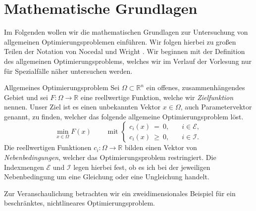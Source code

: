 \section{Mathematische Grundlagen}
\label{s:opt_grundlagen}
Im Folgenden wollen wir die mathematischen Grundlagen zur Untersuchung von allgemeinen Optimierungsproblemen einführen. 
Wir folgen hierbei zu großen Teilen der Notation von Nocedal und Wright \cite{nocedal_1999}. 
Wir beginnen mit der Definition des allgemeinen Optimierungsproblems, welches wir im Verlauf der Vorlesung nur für Spezialfälle näher untersuchen werden.
\begin{definition}{Allgemeines Optimierungsproblem}{}
Sei $\Omega \subset \mathbb{R}^n$ ein offenes, zusammenhängendes Gebiet und sei $F \colon \Omega \rightarrow \mathbb{R}$ eine reellwertige Funktion, welche wir \emph{Zielfunktion} nennen. Unser Ziel ist es einen unbekannten Vektor $x \in \Omega$, auch Parametervektor genannt, zu finden, welcher das folgende allgemeine Optimierungsproblem löst.
\begin{equation}
\label{eq:optimierungsproblem_allgemein}
\min_{x \in \Omega} F(x) \qquad \text{ mit } 
\begin{cases}
c_i(x) \ = \ 0, \quad &i \in \mathcal{E},\\
c_i(x) \ \geq \ 0, \quad &i \in \mathcal{I}.
\end{cases}
\end{equation}
Die reellwertigen Funktionen $c_i \colon \Omega \rightarrow \mathbb{R}$ bilden einen Vektor von \emph{Nebenbedingungen}, welcher das Optimierungsproblem restringiert. Die Indexmengen $\mathcal{E}$ und $\mathcal{I}$ legen hierbei fest, ob es ich bei der jeweiligen Nebenbedingung um eine Gleichung oder eine Ungleichung handelt.
\end{definition}
Zur Veranschaulichung betrachten wir ein zweidimensionales Beispiel für ein beschränktes, nichtlineares Optimierungsproblem.
